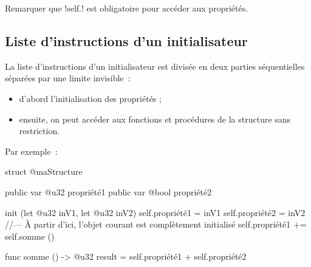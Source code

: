 Remarquer que \ggsq!self.! est obligatoire pour accéder aux propriétés.

\subsection{Liste d'instructions d'un initialisateur}

La liste d'instructions d'un initialisateur est divisée en deux parties séquentielles séparées par une limite invisible~:
\begin{itemize}
  \item d'abord l'initialisation des propriétés ;
  \item ensuite, on peut accéder aux fonctions et procédures de la structure sans restriction.
\end{itemize}

Par exemple~:
\begin{galgas4}
struct @maStructure {
  public var @u32 propriété1
  public var @bool propriété2

  init (let @u32 inV1, let @u32 inV2) {
    self.propriété1 = inV1
    self.propriété2 = inV2
  //--- À partir d'ici, l'objet courant est complètement initialisé
    self.propriété1 += self.somme ()
  }

  func somme () -> @u32 {
    result = self.propriété1 + self.propriété2
  }
}
\end{galgas4}


%
%
%
%
%
%
%


